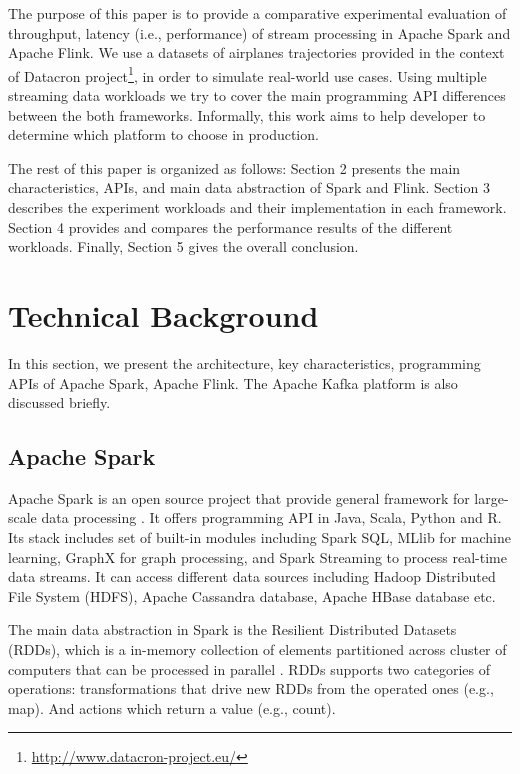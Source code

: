 \documentclass[]{article}
\begin{document}
\par The purpose of this paper is to provide a comparative experimental evaluation of throughput, latency (i.e., performance) of stream processing in Apache Spark and Apache Flink. We use a datasets of airplanes trajectories provided in the context of Datacron project\footnote{\url{http://www.datacron-project.eu/}}, in order to simulate real-world use cases. Using multiple streaming data workloads we try to cover the main programming API differences between the both frameworks. Informally,  this work aims to help developer to determine which platform to choose in production. 

\par The rest of this paper is organized as follows: Section 2
presents the main characteristics, APIs, and main data abstraction of Spark and Flink. Section 3  describes the experiment workloads and their implementation in each framework. Section 4
provides and compares the performance results of the different workloads. Finally, Section 5 gives the overall conclusion.

\section{Technical Background}
 In this section, we present the architecture, key characteristics, programming APIs  of Apache Spark, Apache Flink. The Apache Kafka platform is also discussed briefly.

\subsection{Apache Spark}

\par Apache Spark is an open source project that provide general framework for large-scale data processing \cite{spark}. It offers programming API in Java, Scala, Python and R. Its stack includes set of built-in modules including Spark SQL, MLlib for machine learning, GraphX for graph processing, and Spark Streaming to process real-time data streams. It can access different data sources including Hadoop Distributed File System (HDFS), Apache Cassandra database, Apache HBase database etc.

\par The main data abstraction in Spark is the Resilient Distributed Datasets (RDDs), which is a in-memory collection of elements partitioned across cluster of computers that can be processed in parallel \cite{rdd}. RDDs supports two categories of operations: transformations that drive new RDDs from the operated ones (e.g., map).  And actions which return a value (e.g., count).
\end{document}

